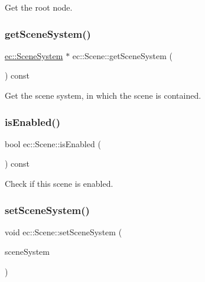 Get the root node. 

\mbox{\label{classec_1_1_scene_a95b79ca1dc856cb50262ab4b9e72465f}} 
\subsubsection{\texorpdfstring{get\+Scene\+System()}{getSceneSystem()}}
{\footnotesize\ttfamily \mbox{\hyperlink{classec_1_1_scene_system}{ec\+::\+Scene\+System}} $\ast$ ec\+::\+Scene\+::get\+Scene\+System (\begin{DoxyParamCaption}{ }\end{DoxyParamCaption}) const}



Get the scene system, in which the scene is contained. 

\mbox{\label{classec_1_1_scene_a0748d645ee5204e64d674c1b10b26864}} 
\subsubsection{\texorpdfstring{is\+Enabled()}{isEnabled()}}
{\footnotesize\ttfamily bool ec\+::\+Scene\+::is\+Enabled (\begin{DoxyParamCaption}{ }\end{DoxyParamCaption}) const}



Check if this scene is enabled. 

\mbox{\label{classec_1_1_scene_a87a6277fea206956c0a7175cf308ece0}} 
\subsubsection{\texorpdfstring{set\+Scene\+System()}{setSceneSystem()}}
{\footnotesize\ttfamily void ec\+::\+Scene\+::set\+Scene\+System (\begin{DoxyParamCaption}\item[{\mbox{\hyperlink{classec_1_1_scene_system}{Scene\+System}} $\ast$}]{scene\+System }\end{DoxyParamCaption})}



